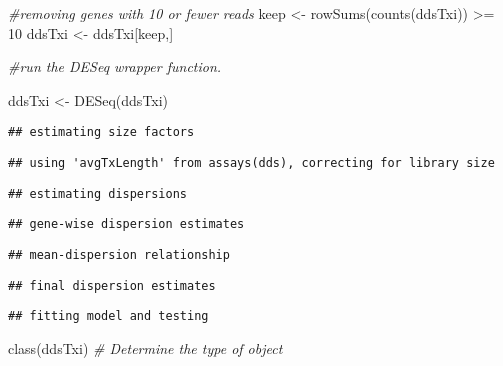 \documentclass[
]{article}
\newenvironment{Shaded}{\begin{snugshade}}{\end{snugshade}}
\newcommand{\CommentTok}[1]{\textcolor[rgb]{0.56,0.35,0.01}{\textit{#1}}}
\newcommand{\DecValTok}[1]{\textcolor[rgb]{0.00,0.00,0.81}{#1}}
\newcommand{\FunctionTok}[1]{\textcolor[rgb]{0.00,0.00,0.00}{#1}}
\newcommand{\NormalTok}[1]{#1}
\newcommand{\OtherTok}[1]{\textcolor[rgb]{0.56,0.35,0.01}{#1}}
\newcommand{\SpecialCharTok}[1]{\textcolor[rgb]{0.00,0.00,0.00}{#1}}
\begin{document}
\begin{Shaded}
\begin{Highlighting}[]
\CommentTok{\#removing genes with 10 or fewer reads}
\NormalTok{keep }\OtherTok{\textless{}{-}} \FunctionTok{rowSums}\NormalTok{(}\FunctionTok{counts}\NormalTok{(ddsTxi)) }\SpecialCharTok{\textgreater{}=} \DecValTok{10}
\NormalTok{ddsTxi }\OtherTok{\textless{}{-}}\NormalTok{ ddsTxi[keep,]}
\end{Highlighting}
\end{Shaded}

\begin{Shaded}
\begin{Highlighting}[]
\CommentTok{\#run the DESeq wrapper function. }

\NormalTok{ddsTxi }\OtherTok{\textless{}{-}} \FunctionTok{DESeq}\NormalTok{(ddsTxi)}
\end{Highlighting}
\end{Shaded}

\begin{verbatim}
## estimating size factors
\end{verbatim}

\begin{verbatim}
## using 'avgTxLength' from assays(dds), correcting for library size
\end{verbatim}

\begin{verbatim}
## estimating dispersions
\end{verbatim}

\begin{verbatim}
## gene-wise dispersion estimates
\end{verbatim}

\begin{verbatim}
## mean-dispersion relationship
\end{verbatim}

\begin{verbatim}
## final dispersion estimates
\end{verbatim}

\begin{verbatim}
## fitting model and testing
\end{verbatim}

\begin{Shaded}
\begin{Highlighting}[]
\FunctionTok{class}\NormalTok{(ddsTxi) }\CommentTok{\# Determine the type of object}
\end{Highlighting}
\end{Shaded}
\end{document}
